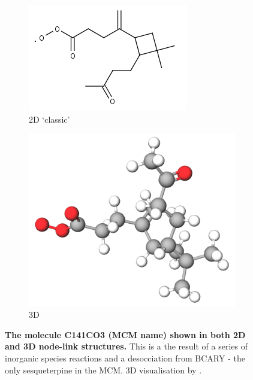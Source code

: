 \begin{figure}[H]
    \centering
    \begin{subfigure}[b]{0.34\textwidth}
        \centering
        \includegraphics[width=\textwidth]{C141CO3.png}
        \caption{2D `classic'}
    \end{subfigure}
    \begin{subfigure}[b]{0.34\textwidth}
        \centering
        \includegraphics[width=\textwidth]{C141CO33d.png}
        \caption{3D}
    \end{subfigure}
       \caption{\textbf{The molecule C141CO3 (MCM name) shown in both 2D and 3D node-link structures.} This is a the result of a series of inorganic species reactions and a desocciation from BCARY - the only sesqueterpine in the MCM.  3D visualisation by \citep{mol3d}. }
       \label{fig:mol}
\end{figure}



